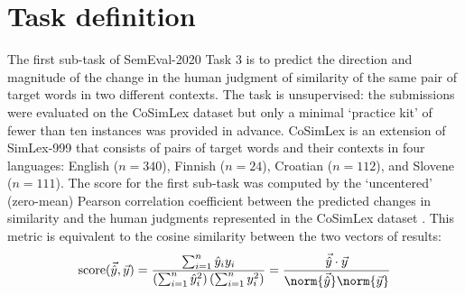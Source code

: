 \section{Task definition}
\label{task-definition}

The first sub-task of SemEval-2020 Task 3 is to predict the direction and magnitude of
the change in the human judgment of similarity of the same pair of target words in two
different contexts.
The task is unsupervised: the submissions were evaluated on the CoSimLex dataset
\parencite[39-42]{Armendariz2020} but only a minimal `practice kit' of fewer than ten
instances was provided in advance.
CoSimLex is an extension of SimLex-999 \parencite{Hill2015} that consists of pairs of
target words and their contexts in four languages: English ($n = 340$), Finnish ($n =
  24$), Croatian ($n = 112$), and Slovene ($n = 111$).
The score for the first sub-task was computed by the `uncentered' (zero-mean) Pearson
correlation coefficient between the predicted changes in similarity and the human
judgments represented in the CoSimLex dataset \parencite[42]{Armendariz2020}.
This metric is equivalent to the cosine similarity between the two vectors of results:
\begin{equation}
  \text{score}(\vec{\hat{y}}, \vec{y})
  = \frac{\sum_{i = 1}^{n} \hat{y}_i y_i}{\left( \sum_{i = 1}^{n} \hat{y}_i^2 \right)\left( \sum_{i = 1}^{n} y_i^2 \right)}
  = \frac{\vec{\hat{y}} \cdot \vec{y}}{\norm{\vec{\hat{y}}} \norm{\vec{y}}}
\end{equation}
